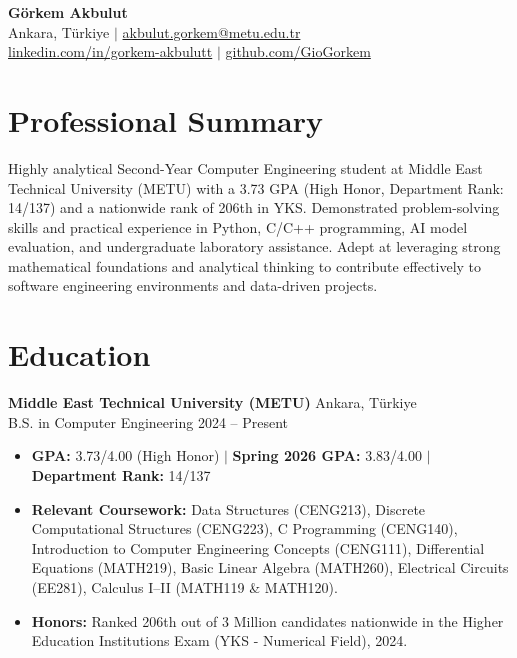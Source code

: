 \documentclass[11pt,a4paper]{article}
\begin{document}
\pagestyle{empty}

\begin{center}
    \textbf{\Huge Görkem Akbulut} \\ \vspace{5pt}
    Ankara, Türkiye $|$ \href{mailto:akbulut.gorkem@metu.edu.tr}{akbulut.gorkem@metu.edu.tr} \\ \vspace{2pt}
    \href{https://www.linkedin.com/in/gorkem-akbulutt}{linkedin.com/in/gorkem-akbulutt} $|$ \href{https://github.com/GioGorkem}{github.com/GioGorkem}
\end{center}

\section*{Professional Summary}
Highly analytical Second-Year Computer Engineering student at Middle East Technical University (METU) with a 3.73 GPA (High Honor, Department Rank: 14/137) and a nationwide rank of 206th in YKS. Demonstrated problem-solving skills and practical experience in Python, C/C++ programming, AI model evaluation, and undergraduate laboratory assistance. Adept at leveraging strong mathematical foundations and analytical thinking to contribute effectively to software engineering environments and data-driven projects.

\section*{Education}
\textbf{Middle East Technical University (METU)} \hfill Ankara, Türkiye \\
B.S. in Computer Engineering \hfill 2024 -- Present
\begin{itemize}
    \item \textbf{GPA:} 3.73/4.00 (High Honor) $|$ \textbf{Spring 2026 GPA:} 3.83/4.00 $|$ \textbf{Department Rank:} 14/137
    \item \textbf{Relevant Coursework:} Data Structures (CENG213), Discrete Computational Structures (CENG223), C Programming (CENG140), Introduction to Computer Engineering Concepts (CENG111), Differential Equations (MATH219), Basic Linear Algebra (MATH260), Electrical Circuits (EE281), Calculus I--II (MATH119 \& MATH120).
    \item \textbf{Honors:} Ranked 206th out of 3 Million candidates nationwide in the Higher Education Institutions Exam (YKS - Numerical Field), 2024.
\end{itemize}
\end{document}

